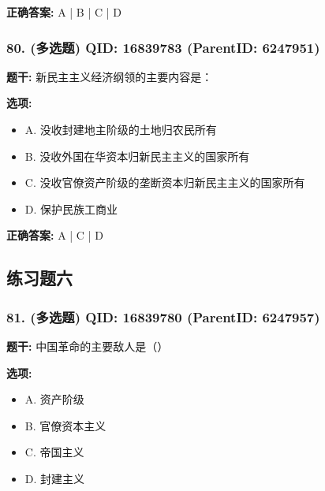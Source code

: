 \documentclass[12pt,UTF8]{ctexart}
\begin{document}
\textbf{正确答案:}
A | B | C | D

\vspace{0.3em}\hrulefill\vspace{0.7em}

\subsubsection*{80. (多选题) \small QID: 16839783 (ParentID: 6247951)}

\textbf{题干:}
新民主主义经济纲领的主要内容是：



\textbf{选项:}
\begin{itemize}[leftmargin=*]

  \item A. 没收封建地主阶级的土地归农民所有

  \item B. 没收外国在华资本归新民主主义的国家所有

  \item C. 没收官僚资产阶级的垄断资本归新民主主义的国家所有

  \item D. 保护民族工商业

\end{itemize}

\textbf{正确答案:}
A | C | D

\vspace{0.3em}\hrulefill\vspace{0.7em}

\subsection*{练习题六}

\subsubsection*{81. (多选题) \small QID: 16839780 (ParentID: 6247957)}

\textbf{题干:}
中国革命的主要敌人是（）



\textbf{选项:}
\begin{itemize}[leftmargin=*]

  \item A. 资产阶级

  \item B. 官僚资本主义

  \item C. 帝国主义

  \item D. 封建主义

\end{itemize}
\end{document}
